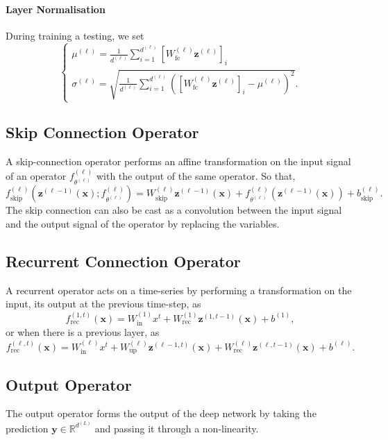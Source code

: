 \paragraph{Layer Normalisation}

During training a testing, we set $$\begin{cases}\mu^{(\ell)}=\frac{1}{d^{(\ell)}}\sum_{i=1}^{d^{(\ell)}}\left[W_{\text{fc}}^{(\ell)}\mathbf{z}^{(\ell)}\right]_i\\\sigma^{(\ell)}=\sqrt{\frac{1}{d^{(\ell)}}\sum_{i=1}^{d^{(\ell)}}\left(\left[W_{\text{fc}}^{(\ell)}\mathbf{z}^{(\ell)}\right]_i-\mu^{(\ell)}\right)^2}.\end{cases}$$

\subsection{Skip Connection Operator}

A skip-connection operator performs an affine transformation on the input signal of an operator $f_{\theta^{(\ell)}}^{(\ell)}$ with the output of the same operator. So that, $$f_{\text{skip}}^{(\ell)}\left(\mathbf{z}^{(\ell-1)}(\mathbf{x});f_{\theta^{(\ell)}}^{(\ell)}\right)=W_{\text{skip}}^{(\ell)}\mathbf{z}^{(\ell-1)}(\mathbf{x})+f_{\theta^{(\ell)}}^{(\ell)}\left(\mathbf{z}^{(\ell-1)}(\mathbf{x})\right)+b_{\text{skip}}^{(\ell)}.$$The skip connection can also be cast as a convolution between the input signal and the output signal of the operator by replacing the variables.

\subsection{Recurrent Connection Operator}

A recurrent operator acts on a time-series by performing a transformation on the input, its output at the previous time-step, as $$f_{\text{rec}}^{(1,t)}(\mathbf{x})=W_{\text{in}}^{(1)}x^t+W_{\text{rec}}^{(1)}\mathbf{z}^{(1,t-1)}(\mathbf{x})+b^{(1)},$$or when there is a previous layer, as $$f_{\text{rec}}^{(\ell,t)}(\mathbf{x})=W_{\text{in}}^{(\ell)}x^t+W_{\text{up}}^{(\ell)}\mathbf{z}^{(\ell-1,t)}(\mathbf{x})+W_{\text{rec}}^{(\ell)}\mathbf{z}^{(\ell,t-1)}(\mathbf{x})+b^{(\ell)}.$$

\subsection{Output Operator}

The output operator forms the output of the deep network by taking the prediction $\mathbf{y}\in\mathbb{R}^{d^{(L)}}$ and passing it through a non-linearity.

